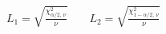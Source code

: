 \documentclass[12pt]{article}
\begin{document}
\pagestyle{empty}
\Large
{}
\pagecolor{ehandbook}

\boldmath
\begin{eqnarray*}
L_1 = \sqrt{\frac{\chi^2_{\alpha/2, \, \nu}}{\nu}} & \,\, & L_2 = \sqrt{\frac{\chi^2_{1-\alpha/2, \, \nu}}{\nu}} 
\end{eqnarray*}
\end{document}
